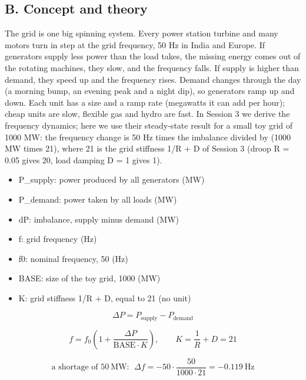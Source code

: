 \documentclass[11pt,a4paper]{article}
\begin{document}
\subsection*{B. Concept and theory}
The grid is one big spinning system. Every power station turbine and many motors turn in step at the grid frequency, 50 Hz in India and Europe. If generators supply less power than the load takes, the missing energy comes out of the rotating machines, they slow, and the frequency falls. If supply is higher than demand, they speed up and the frequency rises. Demand changes through the day (a morning bump, an evening peak and a night dip), so generators ramp up and down. Each unit has a size and a ramp rate (megawatts it can add per hour); cheap units are slow, flexible gas and hydro are fast. In Session 3 we derive the frequency dynamics; here we use their steady-state result for a small toy grid of 1000 MW: the frequency change is 50 Hz times the imbalance divided by (1000 MW times 21), where 21 is the grid stiffness 1/R + D of Session 3 (droop R = 0.05 gives 20, load damping D = 1 gives 1).

\begin{itemize}[nosep]
\item P\_supply: power produced by all generators (MW)
\item P\_demand: power taken by all loads (MW)
\item dP: imbalance, supply minus demand (MW)
\item f: grid frequency (Hz)
\item f0: nominal frequency, 50 (Hz)
\item BASE: size of the toy grid, 1000 (MW)
\item K: grid stiffness 1/R + D, equal to 21 (no unit)
\end{itemize}

\begin{equation*}
\Delta P = P_{\mathrm{supply}} - P_{\mathrm{demand}}
\end{equation*}

\begin{equation*}
f = f_0\left(1 + \frac{\Delta P}{\mathrm{BASE}\cdot K}\right),\qquad K = \frac{1}{R}+D = 21
\end{equation*}

\begin{equation*}
\text{a shortage of } 50\ \mathrm{MW}:\ \ \Delta f = -50\cdot\frac{50}{1000\cdot 21} = -0.119\ \mathrm{Hz}
\end{equation*}
\end{document}
